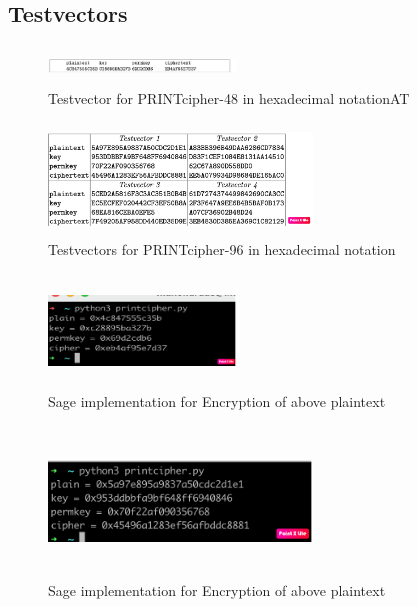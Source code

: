 \documentclass[journal=tosc,preprint]{iacrtrans}
\begin{document}
\subsection{Testvectors}
\begin{figure}[ht]
	\centering
	\includegraphics[height=1cm, width=5cm]{pics/testvector1.png}
	\caption{Testvector for PRINTcipher-48 in hexadecimal notationAT}
\end{figure}

\begin{figure}[ht]
	\centering
	\includegraphics[height=3cm, width=7cm]{pics/testvector-2.png}
	\caption{Testvectors for PRINTcipher-96 in hexadecimal notation}
\end{figure}

\begin{figure}[ht]
	\centering
	\includegraphics[height=3cm, width=5cm]{pics/pic_1.png}
	\caption{Sage implementation for Encryption of above plaintext}
\end{figure}

\begin{figure}[ht]
	\centering
	\includegraphics[height=4cm, width=7cm]{pics/pic_2.png}
	\caption{Sage implementation for Encryption of above plaintext}
\end{figure}
\end{document}
